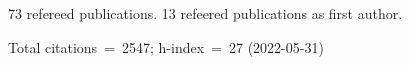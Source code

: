 73 refereed publications. 13 refeered publications as first author.

Total citations~=~2547; h-index~=~27 (2022-05-31)